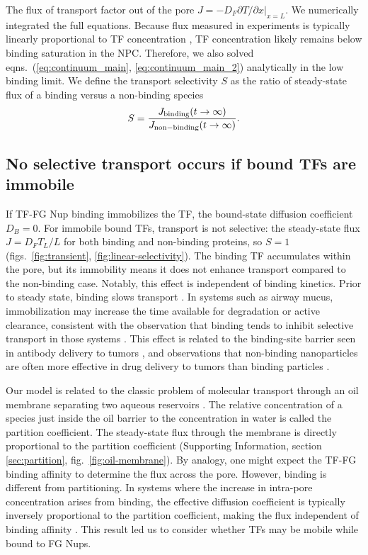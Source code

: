 The flux of transport factor out of the pore
$J = - D_F \left. \partial T/\partial x \right|_{x=L}$. We numerically integrated
the full equations.  Because flux
measured in experiments is typically linearly proportional to TF
concentration \cite{timney06, schmidt15}, TF concentration likely
remains below binding saturation in the NPC. Therefore, we also solved
eqns.~(\ref{eq:continuum_main}, \ref{eq:continuum_main_2})
analytically in the low binding limit.  We define
the transport selectivity $S$ as the ratio of steady-state flux of a
binding versus a non-binding species 
\begin{equation}
  S =  \frac{J_{\rm binding}(t \to \infty)}{J_{\rm non-binding}(t \to \infty)} .
\end{equation}

\subsection{No selective transport occurs if bound TFs are immobile}
If TF-FG Nup binding immobilizes the TF, the bound-state diffusion
coefficient $D_B = 0$.  For immobile bound TFs, transport is not
selective: the steady-state flux $J = D_F T_L/L $ for both binding and
non-binding proteins, so $S = 1$ (figs.~\ref{fig:transient},
\ref{fig:linear-selectivity}).  The binding TF accumulates within the
pore, but its immobility means it does not enhance transport compared
to the non-binding case.  Notably, this effect is independent of
binding kinetics.  Prior to steady state, binding slows transport
.  In systems such as airway mucus,
immobilization may increase the time available for degradation or
active clearance, consistent with the observation that binding tends
to inhibit selective transport in those systems \cite{schneider17,
  huang17, mastorakos15}.  This effect is related to the binding-site
barrier seen in antibody delivery to tumors \cite{juweid92}, and
observations that non-binding nanoparticles are often more effective
in drug delivery to tumors than binding particles \cite{witten17}.

Our model is related to the classic problem of molecular transport
through an oil membrane separating two aqueous reservoirs
\cite{schafer13}.  The relative concentration of a species just inside
the oil barrier to the concentration in water is called the partition
coefficient.  The steady-state flux through the membrane is directly
proportional to the partition coefficient (Supporting Information,
section \ref{sec:partition}, fig.~\ref{fig:oil-membrane}).  By
analogy, one might expect the TF-FG binding affinity to determine the
flux across the pore. However, binding is different from partitioning.
In systems where the increase in intra-pore concentration arises from
binding, the effective diffusion coefficient is typically inversely
proportional to the partition coefficient, making the flux independent
of binding affinity \cite{bickel02}.  This result led us to consider
whether TFs may be mobile while bound to FG Nups.

